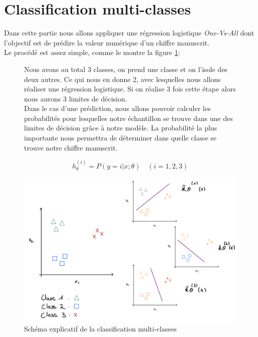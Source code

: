 \clearpage
\section{Classification multi-classes}

Dans cette partie nous allons appliquer une régression logistique \textit{One-Vs-All} dont l'objectif est de prédire la valeur numérique d'un chiffre manuscrit. \\

\noindent
Le procédé est assez simple, comme le montre la figure \ref{fig:multi-class-scheme}:

\begin{figure}[!h]
    \begin{minipage}{.48\linewidth}
        Nous avons au total 3 classes, on prend une classe et on l'isole des deux autres.
        Ce qui nous en donne 2, avec lesquelles nous allons réaliser une régression logistique. Si on réalise 3 fois cette étape alors nous aurons 3 limites de décision. \\
        Dans le cas d'une prédiction, nous allons pouvoir calculer les probabilités pour lesquelles notre échantillon se trouve dans une des limites de décision grâce à notre modèle. La probabilité
        la plus importante nous permettra de déterminer dans quelle classe se trouve notre chiffre manuscrit.

        \begin{equation}\label{eq:proba-multi}
            h_{\theta}^{(i)} = P(y=i|x;\theta) \quad (i = 1, 2, 3)
         \end{equation}

    \end{minipage}\hfill
    \begin{minipage}{.48\linewidth}
        \begin{center}
            \includegraphics[width=1\textwidth]{./img/multi-class-scheme.jpeg}
            \caption{\label{fig:multi-class-scheme}Schéma explicatif de la classification multi-classes}  
        \end{center}
    \end{minipage}
\end{figure}

